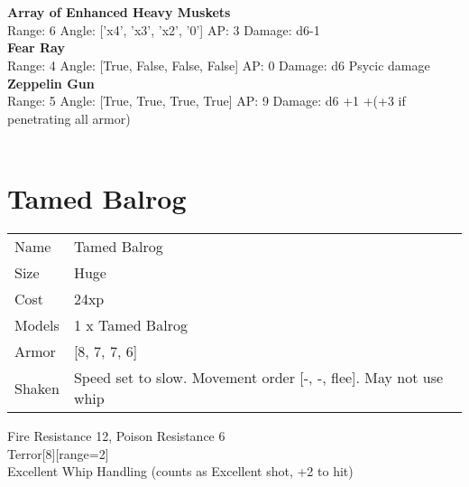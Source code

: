 \ \\

\ \\
{\bf Array of Enhanced Heavy Muskets } \\



Range: 6  Angle: ['x4', 'x3', 'x2', '0'] AP: 3 Damage: d6-1 \\




{\bf Fear Ray } \\



Range: 4  Angle: [True, False, False, False] AP: 0 Damage: d6 Psycic damage \\




{\bf Zeppelin Gun } \\



Range: 5  Angle: [True, True, True, True] AP: 9 Damage: d6 +1 +(+3 if penetrating all armor) \\




 
\ \\













\clearpage

\section{ Tamed Balrog }

\begin{tabular}{ll}
  Name & Tamed Balrog \\
  Size & Huge\\
  Cost & 24xp\\
  Models & 1 x Tamed Balrog\\
  Armor & [8, 7, 7, 6]\\
  Shaken & Speed set to slow. Movement order [-, -, flee]. May not use whip\\
\end{tabular}

\noindent Fire Resistance 12, Poison Resistance 6\\ 
Terror[8][range=2]\\ 
Excellent Whip Handling (counts as Excellent shot, +2 to hit)\\ 


